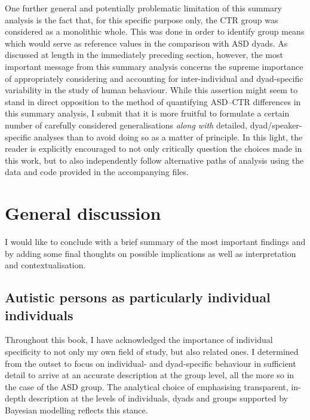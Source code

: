 One further general and potentially problematic limitation of this summary analysis is the fact that, for this specific purpose only, the CTR group was considered as a monolithic whole. This was done in order to identify group means which would serve as reference values in the comparison with ASD dyads. As discussed at length in the immediately preceding section, however, the most important message from this summary analysis concerns the supreme importance of appropriately considering and accounting for inter-individual and dyad-specific variability in the study of human behaviour. While this assertion might seem to stand in direct opposition to the method of quantifying ASD--CTR differences in this summary analysis, I submit that it is more fruitful to formulate a certain number of carefully considered generalisations \emph{along with} detailed, dyad/speaker-specific analyses than to avoid doing so as a matter of principle. In this light, the reader is explicitly encouraged to not only critically question the choices made in this work, but to also independently follow alternative paths of analysis using the data and code provided in the accompanying files.
















\section {General discussion}\label{sec:Conclusion_discussion}
\largerpage
I would like to conclude with a brief summary of the most important findings and by adding some final thoughts on possible implications as well as interpretation and contextualisation.

\subsection{Autistic persons as particularly individual individuals}\label{Conclusion_discussion_individuals}

Throughout this book, I have acknowledged the importance of individual specificity to not only my own field of study, but also related ones. I determined from the outset to focus on individual- and dyad-specific behaviour in sufficient detail to arrive at an accurate description at the group level, all the more so in the case of the ASD group. The analytical choice of emphasising transparent, in-depth description at the levels of individuals, dyads and groups supported by Bayesian modelling reflects this stance.


